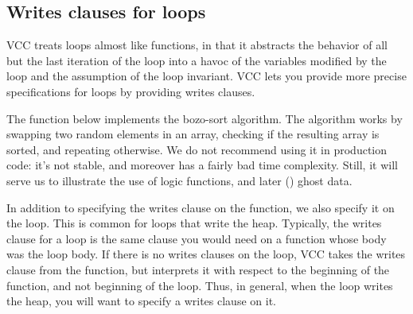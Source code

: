 
\subsection{Writes clauses for loops}
\label{sect:sorting}

VCC treats loops almost like functions, in that it abstracts the
behavior of all but the last iteration of the loop into a havoc of the
variables modified by the loop and the assumption of the loop
invariant. VCC lets you provide more precise specifications for loops
by providing writes clauses.


The function below implements the bozo-sort algorithm.
The algorithm works by swapping two random elements in an array, checking if the resulting array
is sorted, and repeating otherwise.
We do not recommend using it in production code:
it's not stable, and moreover has a fairly bad time complexity.
Still, it will serve us to illustrate the use of logic functions, and later () ghost data.


In addition to specifying the writes clause on the function, we also specify it on
the loop.
This is common for loops that write the heap.
Typically, the writes clause for a loop is the same clause you would need 
on a function whose body was the loop body. 
If there is no writes clauses on the loop, VCC takes the writes clause from the 
function, but interprets it with respect to the beginning of the function,
and not beginning of the loop.
Thus, in general, when the loop writes the heap, you will want to specify a writes clause on it.


%

